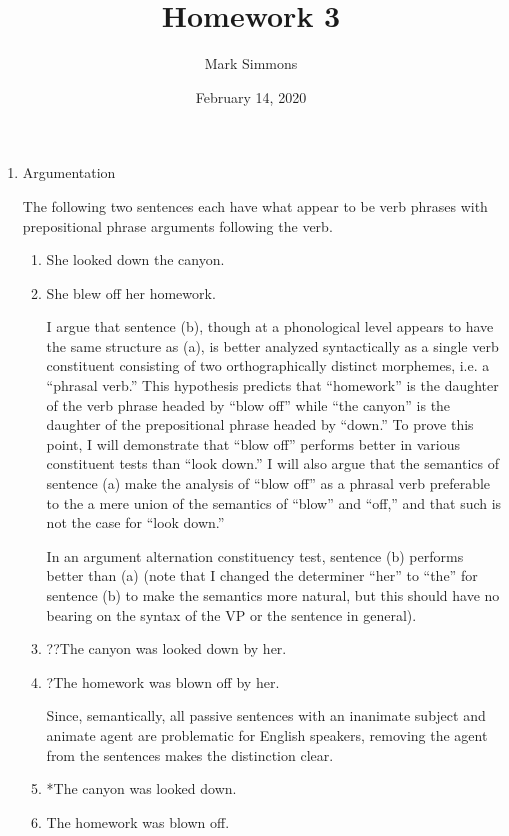 \documentclass[12pt]{article}
\title{Homework 3}
\author{Mark Simmons}
\date{February 14, 2020}
\begin{document}
\maketitle

\begin{enumerate}

\item Argumentation


The following two sentences each have what appear to be verb phrases with prepositional phrase arguments following the verb.

\begin{enumerate}
\item She looked down the canyon.
\item She blew off her homework.

I argue that sentence (b), though at a phonological level appears to have the same structure as (a), is better analyzed syntactically as a single verb constituent consisting of two orthographically distinct morphemes, i.e. a ``phrasal verb.'' This hypothesis predicts that ``homework'' is the daughter of the verb phrase headed by ``blow off'' while ``the canyon'' is the daughter of the prepositional phrase headed by ``down.'' To prove this point, I will demonstrate that ``blow off'' performs better in various constituent tests than ``look down.'' I will also argue that the semantics of sentence (a) make the analysis of ``blow off'' as a phrasal verb preferable to the a mere union of the semantics of ``blow'' and ``off,'' and that such is not the case for ``look down.''

In an argument alternation constituency test, sentence (b) performs better than (a) (note that I changed the determiner ``her'' to ``the'' for sentence (b) to make the semantics more natural, but this should have no bearing on the syntax of the VP or the sentence in general).

\item ??The canyon was looked down by her.
\item ?The homework was blown off by her.

Since, semantically, all passive sentences with an inanimate subject and animate agent are problematic for English speakers, removing the agent from the sentences makes the distinction clear.

\item *The canyon was looked down.
\item The homework was blown off.


\end{enumerate}
\end{enumerate}
\end{document}

